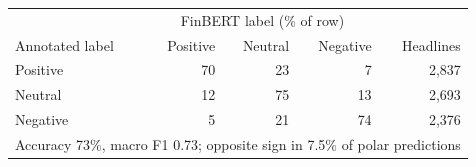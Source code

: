 \begin{tabular}{lrrrr}
\toprule
 & \multicolumn{3}{c}{FinBERT label (\% of row)} & \\
Annotated label & Positive & Neutral & Negative & Headlines \\
\midrule
Positive & 70 & 23 & 7 & 2,837 \\
Neutral & 12 & 75 & 13 & 2,693 \\
Negative & 5 & 21 & 74 & 2,376 \\
\midrule
\multicolumn{5}{l}{Accuracy 73\%, macro F1 0.73; opposite sign in 7.5\% of polar predictions}\\
\bottomrule
\end{tabular}
